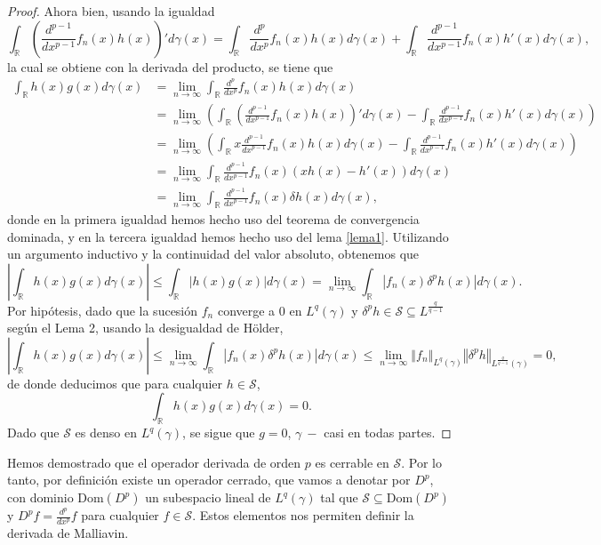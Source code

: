 \documentclass[letterpaper,twoside,12pt]{book}
\newcommand{\R}{\mathbb{R}}
\renewcommand{\S}{\mathcal{S}}
\newcommand{\1}{\mathds{1}}
\newcommand{\abs}[1]{\left\lvert #1 \right\rvert}
\renewcommand{\to}{\rightarrow}
\newcommand{\norm}[1]{\left\Vert #1 \right\Vert}
\theoremstyle{definition}
\theoremstyle{definition}
\theoremstyle{remark}
\theoremstyle{definition}
\theoremstyle{definition}
\theoremstyle{definition}
\theoremstyle{definition}
\theoremstyle{definition}
\begin{document}
\begin{proof}
   Ahora bien, usando la igualdad
   \[
   \int_\R \left(\frac{d^{p-1}}{dx^{p-1}}f_n(x)h(x)\right)'d\gamma(x)=\int_\R \frac{d^{p}}{dx^{p}}f_n(x)h(x)d\gamma(x) +\int _\R \frac{d^{p-1}}{dx^{p-1}}f_n(x)h'(x)d\gamma(x),
   \] 
   la cual se obtiene con la derivada del producto, se tiene que 
   \begin{align*}
       \int_{\R}h(x)g(x)d\gamma(x)&=\lim_{n\to\infty}\int_\R \frac{d^{p}}{dx^{p}}f_n(x) h(x) d\gamma(x)\\
       &=\lim_{n\to\infty}\left(\int_\R \left(\frac{d^{p-1}}{dx^{p-1}}f_n(x)h(x)\right)'d\gamma(x)-\int _\R \frac{d^{p-1}}{dx^{p-1}}f_n(x)h'(x)d\gamma(x)\right)\\
       &=\lim_{n\to\infty}\left(\int_\R x\frac{d^{p-1}}{dx^{p-1}}f_n(x)h(x)d\gamma(x)-\int _\R \frac{d^{p-1}}{dx^{p-1}}f_n(x)h'(x)d\gamma(x)\right)\\
       &=\lim_{n\to\infty}\int_\R \frac{d^{p-1}}{dx^{p-1}}f_n(x) \left(xh(x)-h'(x)\right) d\gamma(x)\\
       &=\lim_{n\to\infty}\int_\R \frac{d^{p-1}}{dx^{p-1}}f_n(x) \delta h(x) d\gamma(x),
   \end{align*}
   donde en la primera igualdad hemos hecho uso del teorema de convergencia dominada, y en la tercera igualdad hemos hecho uso del lema \ref{lema1}. Utilizando un argumento inductivo y la continuidad del valor absoluto, obtenemos que 
   \[
       \abs{\int_{\R}h(x)g(x)d\gamma(x)}\leq\int_{\R}\abs{h(x)g(x)} d\gamma(x)=\lim_{n\to\infty}\int_\R \abs{f_n(x) \delta^{p} h(x)} d\gamma(x).
   \]
   Por hipótesis, dado que la sucesión $f_n$ converge a 0 en $L^{q}(\gamma)$ y $\delta^{p}h \in \S\subseteq L^{\frac{q}{q-1}}$ según el Lema 2, usando la desigualdad de Hölder, 
    \[
       \abs{\int_{\R}h(x)g(x)d\gamma(x)}\leq\lim_{n\to\infty}\int_\R |f_n(x) \delta^{p} h(x)| d\gamma(x)\leq \lim_{n\to \infty}\norm{f_n}_{L^{q}(\gamma)}\norm{\delta^{p}h}_{L^{\frac{q}{q-1}}(\gamma)}=0,
    \]
    de donde deducimos que para cualquier $h\in \S$, 
    \[
      \int_{\R}h(x)g(x)d\gamma(x)=0.
      \]
      Dado que $\S$ es denso en $L^{q}(\gamma)$, se sigue que $g=0$, $\gamma \ - $ casi en todas partes.
      
   \end{proof}
Hemos demostrado que el operador derivada de orden $p$ es cerrable en $\S$. Por lo tanto, por definición existe un operador cerrado, que vamos a denotar por $D^{p}$, con dominio $\text{Dom}(D^{p})$ un subespacio lineal de $L^{q}(\gamma)$ tal que $\S\subseteq \text{Dom}(D^{p})$ y $D^{p}f=\frac{d^{p}}{dx^{p}}f$ para cualquier $f\in \S$. Estos elementos nos permiten definir la derivada de Malliavin.
\end{document}
